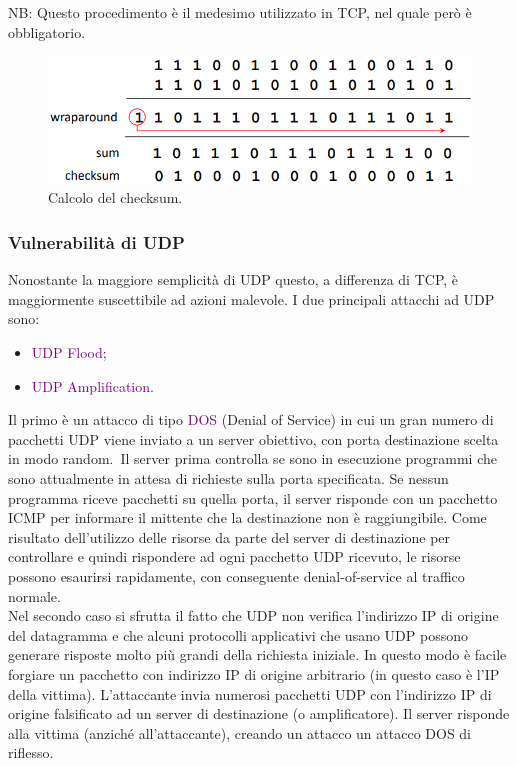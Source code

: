 NB: Questo procedimento è il medesimo utilizzato in TCP, nel quale però è obbligatorio.

\begin{figure}[h]
    \centering
    \includegraphics[scale=0.6]{Immagini/ChecksumUDP.png}
    \caption{Calcolo del checksum.}
\end{figure}

\subsubsection{Vulnerabilità di UDP}
Nonostante la maggiore semplicità di UDP questo, a differenza di TCP, è maggiormente suscettibile ad azioni malevole.
I due principali attacchi ad UDP sono:
\begin{itemize}
    \item \textcolor{purple}{UDP Flood};
    \item \textcolor{purple}{UDP Amplification}.
\end{itemize} 

Il primo è un attacco di tipo \textcolor{purple}{DOS} (Denial of Service) in cui un gran numero di pacchetti UDP viene inviato a un server obiettivo, con porta destinazione scelta in modo random.\
Il server prima controlla se sono in esecuzione programmi che sono attualmente in attesa di richieste sulla porta specificata. 
Se nessun programma riceve pacchetti su quella porta, il server risponde con un pacchetto ICMP per informare il mittente che la destinazione non è raggiungibile.
Come risultato dell'utilizzo delle risorse da parte del server di destinazione per controllare e quindi rispondere ad ogni pacchetto UDP ricevuto, le risorse possono esaurirsi rapidamente, con conseguente denial-of-service al traffico normale.
\\Nel secondo caso si sfrutta il fatto che UDP non verifica l'indirizzo IP di origine del datagramma e che alcuni protocolli applicativi che usano UDP possono generare risposte molto più grandi della richiesta iniziale.
In questo modo è facile forgiare un pacchetto con indirizzo IP di origine arbitrario (in questo caso è l’IP della vittima).
L’attaccante invia numerosi pacchetti UDP con l'indirizzo IP di origine falsificato ad un server di destinazione (o amplificatore).
Il server risponde alla vittima (anziché all'attaccante), creando un attacco un attacco DOS di riflesso.